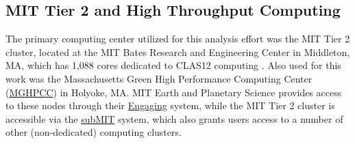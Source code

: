     


\subsection{MIT Tier 2 and High Throughput Computing}

    The primary computing center utilized for this analysis effort was the MIT Tier 2 cluster, located at the MIT Bates Research and Engineering Center in Middleton, MA, which has 1,088 cores dedicated to CLAS12 computing .  Also used for this work was the Massachusetts Green High Performance Computing Center (\href{https://www.mghpcc.org/}{MGHPCC}) in Holyoke, MA. MIT Earth and Planetary Science provides access to these nodes through their \href{https://engaging-ood.mit.edu/pun/sys/dashboard}{Engaging} system, while the MIT Tier 2 cluster is accessible via the \href{https://submit.mit.edu/}{subMIT} system, which also grants users access to a number of other (non-dedicated) computing clusters.

